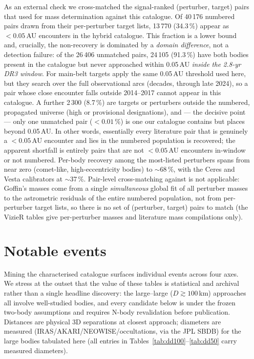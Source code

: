 \documentclass{aa}
\begin{document}
As an external check we cross-matched the signal-ranked (perturber, target)
pairs that \citet{fuentesmunoz2025} used for mass determination against this
catalogue. Of 40\,176 numbered pairs drawn from their per-perturber target
lists, 13\,770 (34.3\,\%) appear as $<0.05$\,AU encounters in the hybrid
catalogue. This fraction is a lower bound and, crucially, the non-recovery is
dominated by a \emph{domain difference}, not a detection failure: of the 26\,406
unmatched pairs, 24\,105 (91.3\,\%) have both bodies present in the catalogue but
never approached within 0.05\,AU \emph{inside the 2.8-yr DR3 window}. For
main-belt targets \citet{fuentesmunoz2025} apply the same 0.05\,AU threshold used
here, but they search over the full observational arcs (decades, through late
2024), so a pair whose close encounter falls outside 2014--2017 cannot appear in
this catalogue. A further 2\,300 (8.7\,\%) are targets or perturbers outside
the numbered, propagated universe (high or provisional designations), and ---
the decisive point --- only one unmatched pair ($<0.01$\,\%) is one our catalogue
contains but places beyond 0.05\,AU. In other words, essentially every literature
pair that is genuinely a $<0.05$\,AU encounter and lies in the numbered
population is recovered; the apparent shortfall is entirely pairs that are not
$<0.05$\,AU encounters in-window or not numbered. Per-body recovery among the
most-listed perturbers spans from near zero (comet-like, high-eccentricity
bodies) to $\sim$68\,\%, with the Ceres and Vesta calibrators at $\sim$37\,\%. Pair-level cross-matching against \citet{goffin2014} is not
applicable: Goffin's masses come from a single \emph{simultaneous} global fit of
all perturber masses to the astrometric residuals of the entire numbered
population, not from per-perturber target lists, so there is no set of
(perturber, target) pairs to match (the VizieR tables give per-perturber masses
and literature mass compilations only).

\section{Notable events}
\label{sec:notable}

Mining the characterised catalogue surfaces individual events across four axes.
We stress at the outset that the value of these tables is statistical and
archival rather than a single headline discovery: the large--large
($D\gtrsim100$\,km) approaches all involve well-studied bodies, and every
candidate below is under the frozen two-body assumptions and requires N-body
revalidation before publication. Distances are physical 3D separations at
closest approach; diameters are measured (IRAS/AKARI/NEOWISE/occultations, via
the JPL SBDB) for the large bodies tabulated here (all entries in
Tables~\ref{tab:dd100}--\ref{tab:dd50} carry measured diameters).
\end{document}

